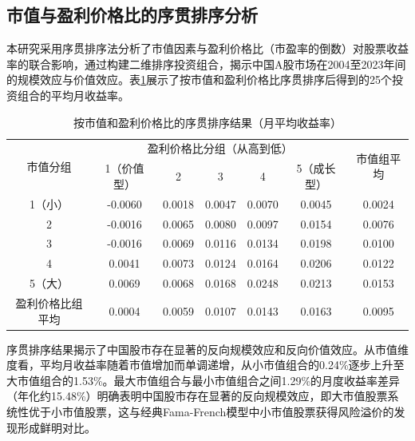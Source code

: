 \documentclass[12pt, a4paper]{article}
\begin{document}
\subsection{市值与盈利价格比的序贯排序分析}

本研究采用序贯排序法分析了市值因素与盈利价格比（市盈率的倒数）对股票收益率的联合影响，通过构建二维排序投资组合，揭示中国A股市场在2004至2023年间的规模效应与价值效应。表\ref{tab:sequential_sorting}展示了按市值和盈利价格比序贯排序后得到的25个投资组合的平均月收益率。

\begin{table}[htbp]
\centering
\caption{按市值和盈利价格比的序贯排序结果（月平均收益率）}
\label{tab:sequential_sorting}
\begin{tabular}{cccccc|c}
\toprule
\multirow{2}{*}{市值分组} & \multicolumn{5}{c|}{盈利价格比分组（从高到低）} & \multirow{2}{*}{市值组平均} \\
 & 1（价值型） & 2 & 3 & 4 & 5（成长型） & \\
\midrule
1（小） & -0.0060 & 0.0018 & 0.0047 & 0.0070 & 0.0045 & 0.0024 \\
2 & -0.0016 & 0.0065 & 0.0080 & 0.0097 & 0.0154 & 0.0076 \\
3 & -0.0016 & 0.0069 & 0.0116 & 0.0134 & 0.0198 & 0.0100 \\
4 & 0.0041 & 0.0073 & 0.0124 & 0.0164 & 0.0206 & 0.0122 \\
5（大） & 0.0069 & 0.0068 & 0.0168 & 0.0248 & 0.0213 & 0.0153 \\
\hline
盈利价格比组平均 & 0.0004 & 0.0059 & 0.0107 & 0.0143 & 0.0163 & 0.0095 \\
\bottomrule
\end{tabular}
\end{table}

序贯排序结果揭示了中国股市存在显著的反向规模效应和反向价值效应。从市值维度看，平均月收益率随着市值增加而单调递增，从小市值组合的0.24\%逐步上升至大市值组合的1.53\%。最大市值组合与最小市值组合之间1.29\%的月度收益率差异（年化约15.48\%）明确表明中国股市存在显著的反向规模效应，即大市值股票系统性优于小市值股票，这与经典Fama-French模型中小市值股票获得风险溢价的发现形成鲜明对比。
\end{document}
